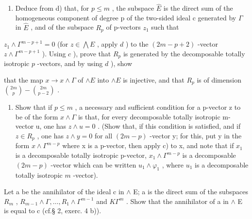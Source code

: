 \begin{enumerate}
\def\labelenumi{\alph{enumi})}
\setcounter{enumi}{4}
\tightlist
\item
  Deduce from d) that, for \(p \leqslant m\) , the subspace \(\hat{E}\) is the direct sum of the homogeneous component of degree p of the two-sided ideal c generated by \(\Gamma\) in \(\hat{E}\) , and of the subspace \(R_{p}\) of p-vectors \(z_{1}\) such that
\end{enumerate}

\(z_{1} \wedge \Gamma^{m-p+1} = 0\) (for \(z \in \bigwedge E\) , apply \(d\) ) to the \((2m - p + 2)\) -vector \(z \wedge \Gamma^{m-p+1}\) ). Using \(c\) ), prove that \(R_{p}\) is generated by the decomposable totally isotropic \(p\) -vectors, and by using \(d\) ), show

that the map \(x \to x \wedge \Gamma\) of \(\wedge E\) into \(\wedge E\) is injective, and that \(R_p\) is of dimension \(\binom{2m}{p} - \binom{2m}{p-2}\) .

\begin{enumerate}
\def\labelenumi{\alph{enumi})}
\setcounter{enumi}{5}
\tightlist
\item
  Show that if \(p \leqslant m\) , a necessary and sufficient condition for a p-vector z to be of the form \(x \wedge \Gamma\) is that, for every decomposable totally isotropic m-vector u, one has \(z \wedge u = 0\) . (Show that, if this condition is satisfied, and if \(z \in R_{p}\) , one has \(z \wedge y = 0\) for all \((2m - p)\) -vector y; for this, put y in the form \(x \wedge \Gamma^{m-p}\) where x is a p-vector, then apply c) to x, and note that if \(x_{1}\) is a decomposable totally isotropic p-vector, \(x_{1} \wedge \Gamma^{m-p}\) is a decomposable \((2m - p)\) -vector which can be written \(u_{1} \wedge \varphi_{1}\) , where \(u_{1}\) is a decomposable totally isotropic \(m\) -vector).
\end{enumerate}

Let a be the annihilator of the ideal c in \(\wedge\) E; a is the direct sum of the subspaces \(R_{m}\) , \(R_{m-1} \wedge \Gamma, \ldots, R_{1} \wedge \Gamma^{m-1}\) and \(K\Gamma^{m}\) . Show that the annihilator of a in \(\wedge\) E is equal to c (cf.§ 2, exerc. 4 b)).


